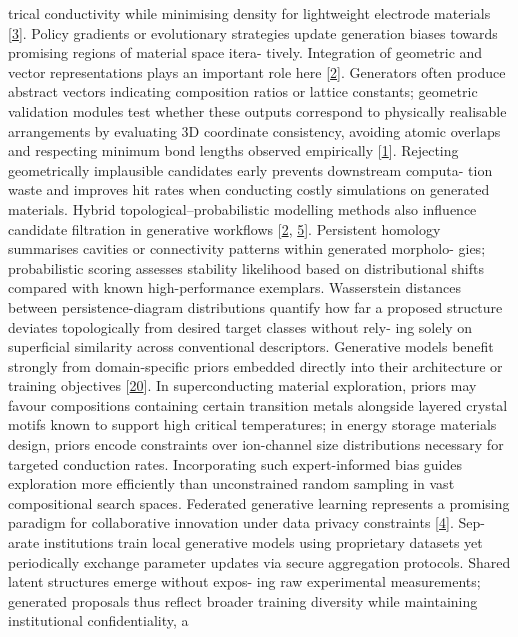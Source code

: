 \documentclass[
]{article}
\begin{document}
trical conductivity while minimising density for lightweight electrode
materials {[}\hyperref[_bookmark43]{3}{]}. Policy gradients or
evolutionary strategies update generation biases towards promising
regions of material space itera- tively. Integration of geometric and
vector representations plays an important role here
{[}\hyperref[_bookmark42]{2}{]}. Generators often produce abstract
vectors indicating composition ratios or lattice constants; geometric
validation modules test whether these outputs correspond to physically
realisable arrangements by evaluating 3D coordinate consistency,
avoiding atomic overlaps and respecting minimum bond lengths observed
empirically {[}\hyperref[_bookmark41]{1}{]}. Rejecting geometrically
implausible candidates early prevents downstream computa- tion waste and
improves hit rates when conducting costly simulations on generated
materials. Hybrid topological--probabilistic modelling methods also
influence candidate filtration in generative workflows
{[}\hyperref[_bookmark42]{2}, \hyperref[_bookmark45]{5}{]}. Persistent
homology summarises cavities or connectivity patterns within generated
morpholo- gies; probabilistic scoring assesses stability likelihood
based on distributional shifts compared with known high-performance
exemplars. Wasserstein distances between persistence-diagram
distributions quantify how far a proposed structure deviates
topologically from desired target classes without rely- ing solely on
superficial similarity across conventional descriptors. Generative
models benefit strongly from domain-specific priors embedded directly
into their architecture or training objectives
{[}\hyperref[_bookmark60]{20}{]}. In superconducting material
exploration, priors may favour compositions containing certain
transition metals alongside layered crystal motifs known to support high
critical temperatures; in energy storage materials design, priors encode
constraints over ion-channel size distributions necessary for targeted
conduction rates. Incorporating such expert-informed bias guides
exploration more efficiently than unconstrained random sampling in vast
compositional search spaces. Federated generative learning represents a
promising paradigm for collaborative innovation under data privacy
constraints {[}\hyperref[_bookmark44]{4}{]}. Sep- arate institutions
train local generative models using proprietary datasets yet
periodically exchange parameter updates via secure aggregation
protocols. Shared latent structures emerge without expos- ing raw
experimental measurements; generated proposals thus reflect broader
training diversity while maintaining institutional confidentiality, a
\end{document}
